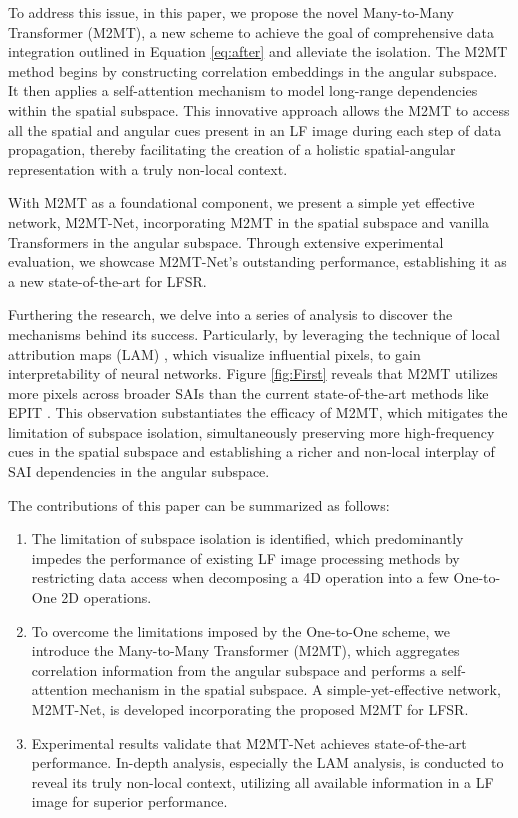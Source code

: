To address this issue, in this paper, we propose the novel Many-to-Many Transformer (M2MT), a new scheme to achieve the goal of comprehensive data integration outlined in Equation \ref{eq:after} and alleviate the isolation. The M2MT method begins by constructing correlation embeddings in the angular subspace. It then applies a self-attention mechanism to model long-range dependencies within the spatial subspace. This innovative approach allows the M2MT to access all the spatial and angular cues present in an LF image during each step of data propagation, thereby facilitating the creation of a holistic spatial-angular representation with a truly non-local context.

With M2MT as a foundational component, we present a simple yet effective network, M2MT-Net, incorporating M2MT in the spatial subspace and vanilla Transformers in the angular subspace. Through extensive experimental evaluation, we showcase M2MT-Net's outstanding performance, establishing it as a new state-of-the-art for LFSR.

Furthering the research, we delve into a series of analysis to discover the mechanisms behind its success. Particularly, by leveraging the technique of local attribution maps (LAM) \cite{guLAM_CVPR2021}, which visualize influential pixels, to gain interpretability of neural networks. Figure \ref{fig:First} reveals that M2MT utilizes more pixels across broader SAIs than the current state-of-the-art methods like EPIT \cite{liangEPIT_arXiv2023}. This observation substantiates the efficacy of M2MT, which mitigates the limitation of subspace isolation, simultaneously preserving more high-frequency cues in the spatial subspace and establishing a richer and non-local interplay of SAI dependencies in the angular subspace.

The contributions of this paper can be summarized as follows:
\begin{enumerate}
    \item The limitation of subspace isolation is identified, which predominantly impedes the performance of existing LF image processing methods by restricting data access when decomposing a 4D operation into a few One-to-One 2D operations.
    \item To overcome the limitations imposed by the One-to-One scheme, we introduce the Many-to-Many Transformer (M2MT), which aggregates correlation information from the angular subspace and performs a self-attention mechanism in the spatial subspace. A simple-yet-effective network, M2MT-Net, is developed incorporating the proposed M2MT for LFSR.
    \item Experimental results validate that M2MT-Net achieves state-of-the-art performance. In-depth analysis, especially the LAM analysis, is conducted to reveal its truly non-local context, utilizing all available information in a LF image for superior performance.
\end{enumerate}